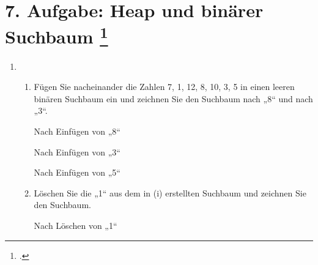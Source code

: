 \documentclass{lehramt-informatik-aufgabe}
\begin{document}
\section{7. Aufgabe: Heap und binärer Suchbaum
\footcite{66115:2013:09}}

\begin{enumerate}

\item \strut

\begin{enumerate}


\item Fügen Sie nacheinander die Zahlen 7, 1, 12, 8, 10, 3, 5 in einen
leeren binären Suchbaum ein und zeichnen Sie den Suchbaum nach „8“ und
nach „3“.

\begin{liDiagramm}{Nach Einfügen von „8“}
\end{liDiagramm}

\begin{liDiagramm}{Nach Einfügen von „3“}
\end{liDiagramm}

\begin{liDiagramm}{Nach Einfügen von „5“}
\end{liDiagramm}


\item Löschen Sie die „1“ aus dem in (i) erstellten Suchbaum und
zeichnen Sie den Suchbaum.

\begin{liDiagramm}{Nach Löschen von „1“}
\end{liDiagramm}


\end{enumerate}
\end{enumerate}
\end{document}
